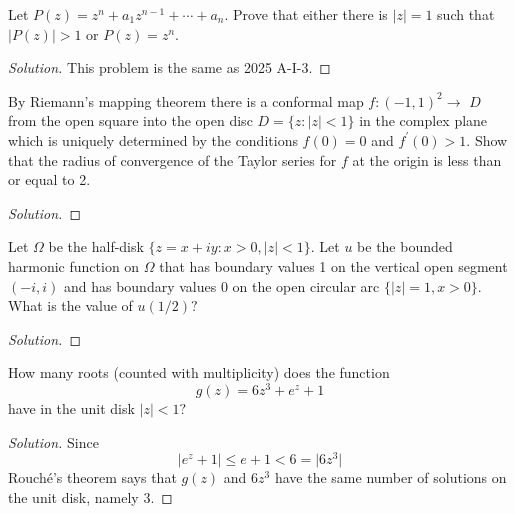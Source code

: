 \documentclass[10pt]{article}
\newenvironment{soln}{\begin{proof}[Solution]}{\end{proof}}
\providecommand{\smabs}[1]{\lvert #1\rvert}
\begin{document}
\begin{problem}
[2021 A-I-2]
Let $P(z)=z^n+a_1 z^{n-1}+\cdots+a_n$. Prove that either there is $|z|=1$ such that $|P(z)|>1$ or $P(z)=z^n$.
\end{problem}

\begin{soln}
    This problem is the same as 2025 A-I-3.
\end{soln}



\begin{problem}
[2021 J-I-6]
By Riemann's mapping theorem there is a conformal map $f:(-1,1)^2 \rightarrow$ $D$ from the open square into the open disc $D=\{z:|z|<1\}$ in the complex plane which is uniquely determined by the conditions $f(0)=0$ and $f^{\prime}(0)>1$. Show that the radius of convergence of the Taylor series for $f$ at the origin is less than or equal to 2.
\end{problem}

\begin{soln}

\end{soln}



\begin{problem}
[2020 A-I-5]
Let $\Omega$ be the half-disk $\{z=x+i y : x>0, \smabs z<1\}.$ Let $u$ be the bounded harmonic function on $\Omega$ that has boundary values 1 on the vertical open segment $(-i, i)$ and has boundary values 0 on the open circular arc $\{|z|=1, x>0\}.$ What is the value of $u(1 / 2) ?$
\end{problem}

\begin{soln}

\end{soln}



\begin{problem}
[2020 A-II-1]
How many roots (counted with multiplicity) does the function
$$
g(z)=6 z^3+e^z+1
$$
have in the unit disk $|z|<1 ?$
\end{problem}

\begin{soln}
    Since
    \begin{equation*}
        \smabs{e^z + 1} \le e + 1 < 6 = \smabs{6z^3}
    \end{equation*}
    Rouch\'e's theorem says that $g(z)$ and $6z^3$
    have the same number of solutions on the unit disk,
    namely $\boxed 3$.
\end{soln}
\end{document}
